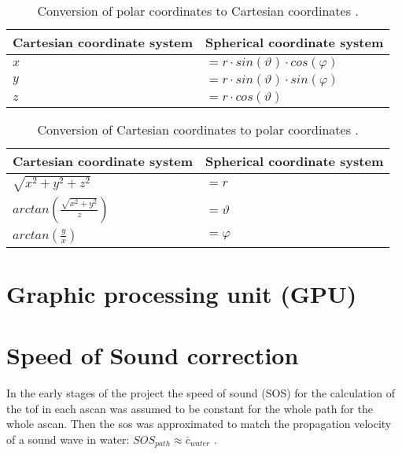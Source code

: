 \begin{table}[H]
\centering
\begin{tabular}{|ll|}
\hline
\textbf{Cartesian coordinate system} & \textbf{Spherical coordinate system}                                                                            \\ \hline
$x $                            & $= r \cdot sin(\vartheta) \cdot cos(\varphi)$ \\
$y $                            & $= r \cdot sin(\vartheta) \cdot sin(\varphi)$ \\
$z $                            & $= r \cdot cos(\vartheta)$                                                  \\ \hline
\end{tabular}
\caption{Conversion of polar coordinates to Cartesian coordinates  \cite{Bronstein2005TaschenbuchMathematik}.}
\label{table_pol_to_cart}
\end{table}


\begin{table}[H]
\centering
\begin{tabular}{|ll|}
\hline
\textbf{Cartesian coordinate system} & \textbf{Spherical coordinate system}                                                                            \\ \hline
$\sqrt{x^2+y^2+z^2} $                               & $= r$ \\
$arctan( \frac{\sqrt{x^2+y^2}}{z} ) $  & $= \vartheta$ \\ 
$arctan( \frac{y}{x} ) $               & $= \varphi$                                                  \\ \hline
\end{tabular}
\caption{Conversion of Cartesian coordinates to polar coordinates \cite{Bronstein2005TaschenbuchMathematik}. }
\label{table_cart_to_Pol}
\end{table}







\section{Graphic processing unit (GPU)}












\section{Speed of Sound correction}
\label{sec:sos_correct}
In the early stages of the project the speed of sound (SOS) for the calculation of the \ac{tof} in each \ac{ascan} was assumed to be constant for the whole path for the whole \ac{ascan}. Then the \ac{sos} was approximated to match the propagation velocity of a sound wave in water: $SOS_{path} \approx  \bar{c}_{water}$ \cite{Kretzek2014GPUAberration}.

